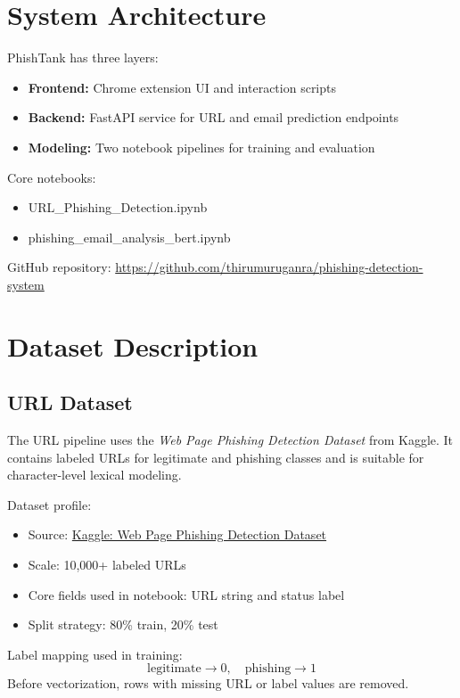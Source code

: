 \documentclass[12pt]{article}
\begin{document}
\section{System Architecture}
PhishTank has three layers:
\begin{itemize}
    \item \textbf{Frontend:} Chrome extension UI and interaction scripts
    \item \textbf{Backend:} FastAPI service for URL and email prediction endpoints
    \item \textbf{Modeling:} Two notebook pipelines for training and evaluation
\end{itemize}

\noindent Core notebooks:
\begin{itemize}
    \item URL\_Phishing\_Detection.ipynb
    \item phishing\_email\_analysis\_bert.ipynb
\end{itemize}

\noindent GitHub repository: \url{https://github.com/thirumuruganra/phishing-detection-system}

\section{Dataset Description}
\subsection{URL Dataset}
The URL pipeline uses the \textit{Web Page Phishing Detection Dataset} from Kaggle. It contains labeled URLs for legitimate and phishing classes and is suitable for character-level lexical modeling.

\noindent Dataset profile:
\begin{itemize}
    \item Source: \href{https://www.kaggle.com/datasets/shashwatwork/web-page-phishing-detection-dataset}{Kaggle: Web Page Phishing Detection Dataset}
    \item Scale: 10,000+ labeled URLs
    \item Core fields used in notebook: URL string and status label
    \item Split strategy: 80\% train, 20\% test
\end{itemize}

\noindent Label mapping used in training:
\[
\text{legitimate} \rightarrow 0, \quad \text{phishing} \rightarrow 1
\]
Before vectorization, rows with missing URL or label values are removed.
\end{document}
